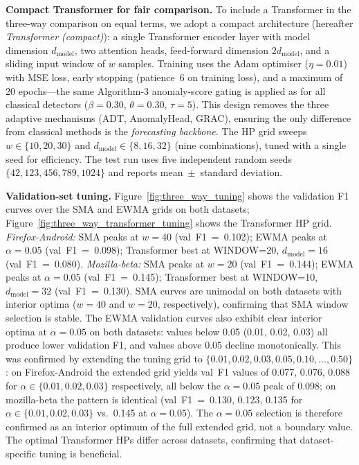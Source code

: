 \documentclass[a4paper,fleqn]{cas-sc}
\theoremstyle{plain}
\begin{document}
\textbf{Compact Transformer for fair comparison.}
To include a Transformer in the three-way comparison on equal terms, we adopt
a compact architecture (hereafter \emph{Transformer (compact)}):
a single Transformer encoder layer with model dimension $d_{\text{model}}$,
two attention heads, feed-forward dimension $2 d_{\text{model}}$, and a
sliding input window of $w$ samples.
Training uses the Adam optimiser ($\eta=0.01$) with MSE loss, early stopping
(patience~6 on training loss), and a maximum of 20 epochs---the same
Algorithm-3 anomaly-score gating is applied as for all classical detectors
($\beta=0.30$, $\theta=0.30$, $\tau=5$).
This design removes the three adaptive mechanisms (ADT, AnomalyHead, GRAC),
ensuring the only difference from classical methods is the
\emph{forecasting backbone}.
The HP grid sweeps $w \in \{10, 20, 30\}$ and $d_{\text{model}} \in \{8, 16, 32\}$
(nine combinations), tuned with a single seed for efficiency.
The test run uses five independent random seeds $\{42, 123, 456, 789, 1024\}$
and reports mean~$\pm$~standard deviation.

\textbf{Validation-set tuning.}
Figure~\ref{fig:three_way_tuning} shows the validation F1 curves over the
SMA and EWMA grids on both datasets;
Figure~\ref{fig:three_way_transformer_tuning} shows the Transformer HP grid.
\textit{Firefox-Android:} SMA peaks at $w=40$ (val~F1~=~0.102); EWMA peaks
at $\alpha=0.05$ (val~F1~=~0.098); Transformer best at WINDOW=20,
$d_{\text{model}}=16$ (val~F1~=~0.080).
\textit{Mozilla-beta:} SMA peaks at $w=20$ (val~F1~=~0.144); EWMA peaks
at $\alpha=0.05$ (val~F1~=~0.145); Transformer best at WINDOW=10,
$d_{\text{model}}=32$ (val~F1~=~0.130).
SMA curves are unimodal on both datasets with interior optima ($w=40$ and
$w=20$, respectively), confirming that SMA window selection is stable.
The EWMA validation curves also exhibit clear interior optima at $\alpha=0.05$
on both datasets: values below 0.05 (0.01, 0.02, 0.03) all produce lower
validation F1, and values above 0.05 decline monotonically.
This was confirmed by extending the tuning grid to
$\{0.01, 0.02, 0.03, 0.05, 0.10, \ldots, 0.50\}$:
on Firefox-Android the extended grid yields val~F1 values of
0.077, 0.076, 0.088 for $\alpha \in \{0.01, 0.02, 0.03\}$ respectively,
all below the $\alpha=0.05$ peak of 0.098;
on mozilla-beta the pattern is identical
(val~F1~=~0.130, 0.123, 0.135 for $\alpha \in \{0.01, 0.02, 0.03\}$
vs.\ 0.145 at $\alpha=0.05$).
The $\alpha=0.05$ selection is therefore confirmed as an interior optimum
of the full extended grid, not a boundary value.
The optimal Transformer HPs differ across datasets, confirming that
dataset-specific tuning is beneficial.
\end{document}
